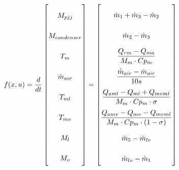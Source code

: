 \begin{equation} \label{eq:f_noSub} \renewcommand{\arraystretch}{2.4}
	f(x,u) =  \dfrac{d}{dt} \begin{bmatrix}
		M_{pjj}		\\					%
		M_{condenser} 	\\				%
		T_m 			\\				%
		\dot{m}_{air}	\\				%
		T_{ml}			\\				%
		T_{mv}			\\				%
		M_l				\\				%
		M_v				\\				%
	\end{bmatrix}
	=
	\begin{bmatrix}
		\dot{m}_1 + \dot{m}_3 - \dot{m}_2 \\										%
		\dot{m}_{2} - \dot{m}_{3}	\\												%
		\dfrac{Q_{rm} - Q_{ma}}{M_m \cdot Cp_m} \\									%
		\dfrac{\bar{\dot{m}}_{air}  - \dot{m}_{air}} {10s}		\\					%
		\dfrac{Q_{aml}-Q_{ml} + Q_{mvml}}{M_m \cdot Cp_m \cdot \sigma}        \\	%
		\dfrac{Q_{amv} - Q_{mv} - Q_{mvml}}{M_m \cdot Cp_m \cdot (1- \sigma)}	\\	%
		\dot{m}_{5} - \dot{m}_{lv}		\\											%
		\dot{m}_{lv} - \dot{m}_{1}	\\												%
	\end{bmatrix}
\end{equation}






